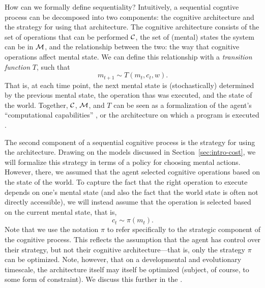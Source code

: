 How can we formally define sequentiality? Intuitively, a sequential cogntive process can be decomposed into two components: the cognitive architecture and the strategy for using that architecture. The cognitive architecture consists of the set of operations that can be performed $\mathcal{C}$, the set of (mental) states the system can be in $\mathcal{M}$, and the relationship between the two: the way that cognitive operations affect mental state. We can define this relationship with a \emph{transition function} $T$, such that
\begin{equation}
  m_{t+1} \sim T(m_t, c_t, w).
\end{equation}
That is, at each time point, the next mental state is (stochastically) determined by the previous mental state, the operation thas was executed, and the state of the world. Together, $\mathcal{C}$, $\mathcal{M}$, and $T$ can be seen as a formalization of the agent's ``computational capabilities'' \citep{simon1955behavioral}, or the architecture on which a program is executed \citep{russell1995provably}.

The second component of a sequential cognitive process is the strategy for using the architecture. Drawing on the models discussed in Section~\ref{sec:intro-cost}, we will formalize this strategy in terms of a policy for choosing mental actions. However, there, we assumed that the agent selected cognitive operations based on the state of the world. To capture the fact that the right operation to execute depends on one's mental state (and also the fact that the world state is often not directly accessible), we will instead assume that the operation is selected based on the current mental state, that is,
\begin{equation}\label{eq:intro-sequential}
   c_t \sim \pi(m_t).
\end{equation}
Note that we use the notation $\pi$ to refer specifically to the strategic component of the cognitive process. This reflects the assumption that the agent has control over their strategy, but not their cognitive architecture---that is, only the strategy $\pi$ can be optimized. Note, however, that on a developmental and evolutionary timescale, the architecture itself may itself be optimized (subject, of course, to some form of constraint). We discuss this further in the .

